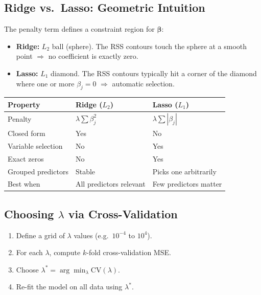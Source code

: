 \documentclass[12pt, a4paper]{article}
\begin{document}
\subsection{Ridge vs.\ Lasso: Geometric Intuition}

The penalty term defines a constraint region for $\boldsymbol{\beta}$:
\begin{itemize}
  \item \textbf{Ridge:} $L_2$ ball (sphere). The RSS contours touch the sphere at a smooth point $\Rightarrow$ no coefficient is exactly zero.
  \item \textbf{Lasso:} $L_1$ diamond. The RSS contours typically hit a corner of the diamond where one or more $\beta_j = 0$ $\Rightarrow$ automatic selection.
\end{itemize}

\begin{center}
\renewcommand{\arraystretch}{1.3}
\begin{tabular}{lll}
\toprule
\textbf{Property} & \textbf{Ridge ($L_2$)} & \textbf{Lasso ($L_1$)} \\
\midrule
Penalty              & $\lambda\sum\beta_j^2$     & $\lambda\sum|\beta_j|$ \\
Closed form          & Yes                        & No \\
Variable selection   & No                         & Yes \\
Exact zeros          & No                         & Yes \\
Grouped predictors   & Stable                     & Picks one arbitrarily \\
Best when            & All predictors relevant    & Few predictors matter \\
\bottomrule
\end{tabular}
\end{center}

\subsection{Choosing $\lambda$ via Cross-Validation}

\begin{enumerate}
  \item Define a grid of $\lambda$ values (e.g.\ $10^{-4}$ to $10^4$).
  \item For each $\lambda$, compute $k$-fold cross-validation MSE.
  \item Choose $\lambda^* = \arg\min_\lambda \text{CV}(\lambda)$.
  \item Re-fit the model on all data using $\lambda^*$.
\end{enumerate}
\end{document}
